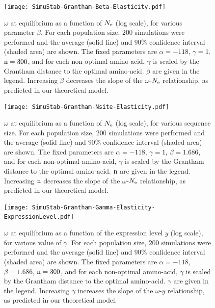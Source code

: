 \begin{figure}[H]
	\centering
	\texttt{[image: SimuStab-Grantham-Beta-Elasticity.pdf]}
	\caption[Effect of $\beta$ on the susceptibility]{
	$\omega$ at equilibrium as a function of $N_{\mathrm{e}}$ (log scale), for various parameter $\beta$.
	For each population size, $200$ simulations were performed and the average (solid line) and $90\%$ confidence interval (shaded area) are shown.
	The fixed parameters are $\alpha=-118$, $\gamma=1$, $\text{n}=300$, and for each non-optimal amino-acid, $\gamma$ is scaled by the Grantham distance to the optimal amino-acid. $\beta$ are given in the legend.
	Increasing $\beta$ decreases the slope of the $\omega$-$N_{\mathrm{e}}$ relationship, as predicted in our theoretical model.
	}
\end{figure}

\begin{figure}[H]
	\centering
	\texttt{[image: SimuStab-Grantham-Nsite-Elasticity.pdf]}
	\caption[Effect of sequence size on the susceptibility]{
	$\omega$ at equilibrium as a function of $N_{\mathrm{e}}$ (log scale), for various sequence size.
	For each population size, $200$ simulations were performed and the average (solid line) and $90\%$ confidence interval (shaded area) are shown.
	The fixed parameters are $\alpha=-118$, $\gamma=1$, $\beta=1.686$, and for each non-optimal amino-acid, $\gamma$ is scaled by the Grantham distance to the optimal amino-acid. $\text{n}$ are given in the legend.
	Increasing $\text{n}$ decreases the slope of the $\omega$-$N_{\mathrm{e}}$ relationship, as predicted in our theoretical model.
	}
\end{figure}

\begin{figure}[H]
	\centering
	\texttt{[image: SimuStab-Grantham-Gamma-Elasticity-ExpressionLevel.pdf]}
	\caption[Effect of $\gamma$ on the susceptibility with regards to expression level]{
	$\omega$ at equilibrium as a function of the expression level $y$ (log scale), for various value of $\gamma$.
	For each population size, $200$ simulations were performed and the average (solid line) and $90\%$ confidence interval (shaded area) are shown.
	The fixed parameters are $\alpha=-118$, $\beta=1.686$, $\text{n}=300$, and for each non-optimal amino-acid, $\gamma$ is scaled by the Grantham distance to the optimal amino-acid. $\gamma$ are given in the legend.
	Increasing $\gamma$ increases the slope of the $\omega$-$y$ relationship, as predicted in our theoretical model.
	}
\end{figure}

